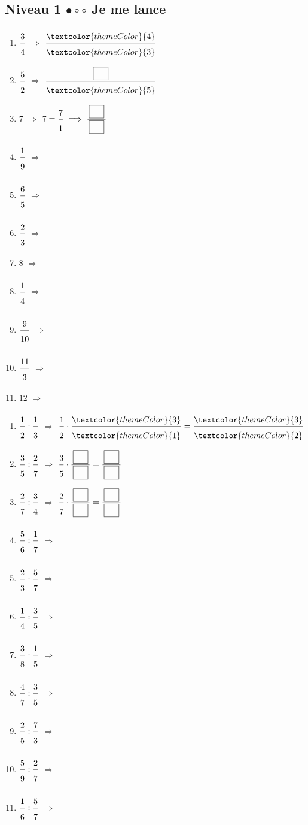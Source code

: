 \subsection{Niveau 1 \quad $\bullet\circ\circ$ \quad Je me lance}
 
 
\begin{enumerate}[leftmargin=*,align=parleft, label=\alph*), itemsep=9pt]
\item $\FA{3}{4}$ \quad $\Longrightarrow$ \quad $\FA{\textcolor{themeColor}{4}}{\textcolor{themeColor}{3}}$
\item $\FA{5}{2}$ \quad $\Longrightarrow$ \quad $\FA{\CaseC}{\textcolor{themeColor}{5}}$
\item $7$ \quad $\Longrightarrow$ \quad $7=\FA{7}{1}\;\Longrightarrow\;\FA{\CaseC}{\CaseC}$
\item $\FA{1}{9}$ \quad $\Longrightarrow$
\item $\FA{6}{5}$ \quad $\Longrightarrow$
\item $\FA{2}{3}$ \quad $\Longrightarrow$
\item $8$ \quad $\Longrightarrow$
\item $\FA{1}{4}$ \quad $\Longrightarrow$
\item $\FA{9}{10}$ \quad $\Longrightarrow$
\item $\FA{11}{3}$ \quad $\Longrightarrow$
\item $12$ \quad $\Longrightarrow$
\end{enumerate}
 
\newpage
{}
 
\begin{enumerate}[leftmargin=*,align=parleft, label=\alph*), itemsep=9pt]
\item $\FA{1}{2}:\FA{1}{3}$ \quad $\Longrightarrow$ \quad $\FA{1}{2}\cdot\FA{\textcolor{themeColor}{3}}{\textcolor{themeColor}{1}}=\FA{\textcolor{themeColor}{3}}{\textcolor{themeColor}{2}}$
\item $\FA{3}{5}:\FA{2}{7}$ \quad $\Longrightarrow$ \quad $\FA{3}{5}\cdot\FA{\CaseC}{\CaseC}=\FA{\CaseC}{\CaseC}$
\item $\FA{2}{7}:\FA{3}{4}$ \quad $\Longrightarrow$ \quad $\FA{2}{7}\cdot\FA{\CaseC}{\CaseC}=\FA{\CaseC}{\CaseC}$
\item $\FA{5}{6}:\FA{1}{7}$ \quad $\Longrightarrow$
\item $\FA{2}{3}:\FA{5}{7}$ \quad $\Longrightarrow$
\item $\FA{1}{4}:\FA{3}{5}$ \quad $\Longrightarrow$
\item $\FA{3}{8}:\FA{1}{5}$ \quad $\Longrightarrow$
\item $\FA{4}{7}:\FA{3}{5}$ \quad $\Longrightarrow$
\item $\FA{2}{5}:\FA{7}{3}$ \quad $\Longrightarrow$
\item $\FA{5}{9}:\FA{2}{7}$ \quad $\Longrightarrow$
\item $\FA{1}{6}:\FA{5}{7}$ \quad $\Longrightarrow$
\end{enumerate}
 

